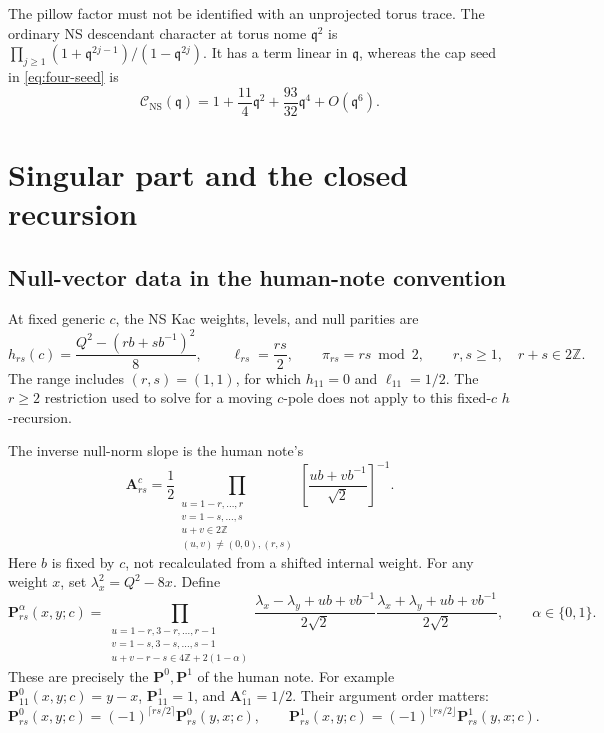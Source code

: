 \documentclass[11pt]{article}
\numberwithin{equation}{section}
\newcommand{\NS}{\mathrm{NS}}
\newcommand{\fq}{\mathfrak q}
\newcommand{\cC}{\mathcal C}
\begin{document}
The pillow factor must not be identified with an unprojected torus trace.
The ordinary NS descendant character at torus nome $\fq^2$ is
$\prod_{j\geq1}(1+\fq^{2j-1})/(1-\fq^{2j})$. It has a term linear in
$\fq$, whereas the cap seed in \eqref{eq:four-seed} is
\begin{equation}
 \cC_{\NS}(\fq)=1+\frac{11}{4}\fq^2
                  +\frac{93}{32}\fq^4+O(\fq^6).
\end{equation}

\section{Singular part and the closed recursion}
\label{sec:recursion}

\subsection{Null-vector data in the human-note convention}

At fixed generic $c$, the NS Kac weights, levels, and null parities are
\begin{equation}
 h_{rs}(c)=\frac{Q^2-(rb+sb^{-1})^2}{8},\qquad
 \ell_{rs}=\frac{rs}{2},\qquad \pi_{rs}=rs\bmod2,
 \qquad r,s\geq1,\quad r+s\in2\mathbb Z.
 \label{eq:Kac}
\end{equation}
The range includes $(r,s)=(1,1)$, for which $h_{11}=0$ and
$\ell_{11}=1/2$. The $r\geq2$ restriction used to solve for a moving
$c$-pole does not apply to this fixed-$c$ $h$-recursion.

The inverse null-norm slope is the human note's
\begin{equation}
 \mathbf A^c_{rs}
 =\frac12
 \prod_{\substack{u=1-r,\ldots,r\\v=1-s,\ldots,s\\
                    u+v\in2\mathbb Z\\
                    (u,v)\ne(0,0),(r,s)}}
 \left[\frac{ub+vb^{-1}}{\sqrt2}\right]^{-1}.
 \label{eq:A}
\end{equation}
Here $b$ is fixed by $c$, not recalculated from a shifted internal weight.
For any weight $x$, set $\lambda_x^2=Q^2-8x$. Define
\begin{equation}
 \mathbf P^{\alpha}_{rs}(x,y;c)
 =\prod_{\substack{u=1-r,3-r,\ldots,r-1\\
                    v=1-s,3-s,\ldots,s-1\\
                    u+v-r-s\in4\mathbb Z+2(1-\alpha)}}
 \frac{\lambda_x-\lambda_y+ub+vb^{-1}}{2\sqrt2}
 \frac{\lambda_x+\lambda_y+ub+vb^{-1}}{2\sqrt2},
 \qquad \alpha\in\{0,1\}.
 \label{eq:P}
\end{equation}
These are precisely the $\mathbf P^0,\mathbf P^1$ of the human note.
For example $\mathbf P^0_{11}(x,y;c)=y-x$, $\mathbf P^1_{11}=1$,
and $\mathbf A^c_{11}=1/2$. Their argument order matters:
\begin{equation}
 \mathbf P^0_{rs}(x,y;c)=(-1)^{\lceil rs/2\rceil}
                         \mathbf P^0_{rs}(y,x;c),\qquad
 \mathbf P^1_{rs}(x,y;c)=(-1)^{\lfloor rs/2\rfloor}
                         \mathbf P^1_{rs}(y,x;c).
\end{equation}
\end{document}
